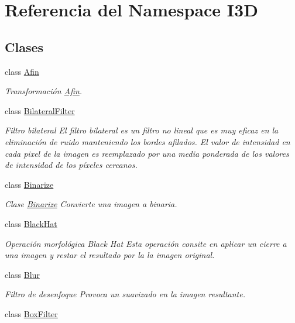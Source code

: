 \hypertarget{namespace_i3_d}{}\section{Referencia del Namespace I3D}
\label{namespace_i3_d}
\subsection*{Clases}
\begin{DoxyCompactItemize}
\item 
class \hyperlink{class_i3_d_1_1_afin}{Afin}
\begin{DoxyCompactList}\small\item\em Transformación \hyperlink{class_i3_d_1_1_afin}{Afin}. \end{DoxyCompactList}\item 
class \hyperlink{class_i3_d_1_1_bilateral_filter}{Bilateral\+Filter}
\begin{DoxyCompactList}\small\item\em Filtro bilateral El filtro bilateral es un filtro no lineal que es muy eficaz en la eliminación de ruido manteniendo los bordes afilados. El valor de intensidad en cada pixel de la imagen es reemplazado por una media ponderada de los valores de intensidad de los píxeles cercanos. \end{DoxyCompactList}\item 
class \hyperlink{class_i3_d_1_1_binarize}{Binarize}
\begin{DoxyCompactList}\small\item\em Clase \hyperlink{class_i3_d_1_1_binarize}{Binarize} Convierte una imagen a binaria. \end{DoxyCompactList}\item 
class \hyperlink{class_i3_d_1_1_black_hat}{Black\+Hat}
\begin{DoxyCompactList}\small\item\em Operación morfológica Black Hat Esta operación consite en aplicar un cierre a una imagen y restar el resultado por la la imagen original. \end{DoxyCompactList}\item 
class \hyperlink{class_i3_d_1_1_blur}{Blur}
\begin{DoxyCompactList}\small\item\em Filtro de desenfoque Provoca un suavizado en la imagen resultante. \end{DoxyCompactList}\item 
class \hyperlink{class_i3_d_1_1_box_filter}{Box\+Filter}

\end{DoxyCompactItemize}
